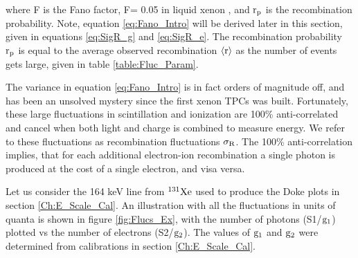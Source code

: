 \noindent where F is the Fano factor, F= 0.05 in liquid xenon \cite{FanoTheoretical}, and $\rm r_p$ is the recombination probability. Note, equation \ref{eq:Fano_Intro} will be derived later in this section, given in equations \ref{eq:SigR_g} and \ref{eq:SigR_e}. The recombination probability $\rm r_p$ is equal to the average observed recombination $\rm \left<r\right>$ as the number of events gets large, given in table \ref{table:Fluc_Param}.

The variance in equation \ref{eq:Fano_Intro} is in fact orders of magnitude off, and has been an unsolved mystery since the first xenon TPCs was built. Fortunately, these large fluctuations in scintillation and ionization are 100\% anti-correlated and cancel when both light and charge is combined to measure energy. We refer to these fluctuations as recombination fluctuations $\rm \sigma_R$. The 100\% anti-correlation implies, that for each additional electron-ion recombination a single photon is produced at the cost of a single electron, and visa versa.

Let us consider the 164 keV line from $\rm ^{131}Xe$ used to produce the Doke plots in section \ref{Ch:E_Scale_Cal}. An illustration with all the fluctuations in units of quanta is shown in figure \ref{fig:Flucs_Ex}, with the number of photons (S1/$\rm g_1$) plotted vs the number of electrons (S2/$\rm g_2$). The values of $\rm g_1$ and $\rm g_2$ were determined from calibrations in section \ref{Ch:E_Scale_Cal}.

